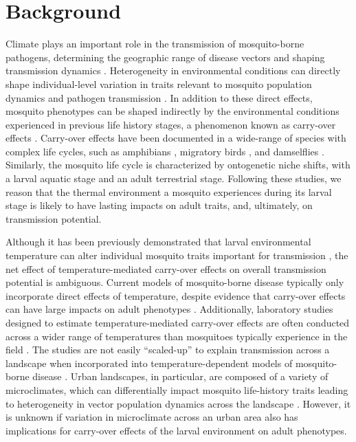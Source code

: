 \documentclass[doublespacing, linenumbers]{bmcart}
\begin{document}
\section*{Background}

Climate plays an important role in the transmission of mosquito-borne pathogens, determining the geographic range of disease vectors and shaping transmission dynamics \cite{reiter2001, parham2015}.
Heterogeneity in environmental conditions can directly shape individual-level variation in traits relevant to mosquito population dynamics \cite{delatte2009} and pathogen transmission \cite{murdock2012}.
In addition to these direct effects, mosquito phenotypes can be shaped indirectly by the environmental conditions experienced in previous life history stages, a phenomenon known as carry-over effects \cite{harrison2011}.
Carry-over effects have been documented in a wide-range of species with complex life cycles, such as amphibians \cite{vonesh2005}, migratory birds \cite{norris2006}, and damselflies \cite{deblock2005a}.
Similarly, the mosquito life cycle is characterized by ontogenetic niche shifts, with a larval aquatic stage and an adult terrestrial stage.
Following these studies, we reason that the thermal environment a mosquito experiences during its larval stage is likely to have lasting impacts on adult traits, and, ultimately, on transmission potential.

Although it has been previously demonstrated that larval environmental temperature can alter individual mosquito traits important for transmission \cite{alto2013,buckner2016}, the net effect of temperature-mediated carry-over effects on overall transmission potential is ambiguous.
Current models of mosquito-borne disease typically only incorporate direct effects of temperature, despite evidence that carry-over effects can have large impacts on adult phenotypes \cite{muturi2011c, muturi2011a, price2015}.
Additionally, laboratory studies designed to estimate temperature-mediated carry-over effects are often conducted across a wider range of temperatures than mosquitoes typically experience in the field \cite{cator2013}.
The studies are not easily ``scaled-up'' to explain transmission across a landscape when incorporated into temperature-dependent models of mosquito-borne disease \cite{reiner2013}.
Urban landscapes, in particular, are composed of a variety of microclimates, which can differentially impact mosquito life-history traits leading to heterogeneity in vector population dynamics across the landscape \cite{murdock2017}.
However, it is unknown if  variation in microclimate across an urban area also has implications for carry-over effects of the larval environment on adult phenotypes.
\end{document}

